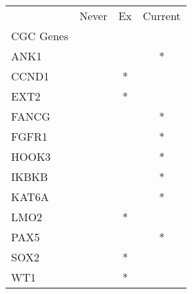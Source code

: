 \begin{tabular}{lccc}
\toprule
{} & Never & Ex & Current \\
CGC Genes &       &    &         \\
\midrule
ANK1      &       &    &       * \\
CCND1     &       &  * &         \\
EXT2      &       &  * &         \\
FANCG     &       &    &       * \\
FGFR1     &       &    &       * \\
HOOK3     &       &    &       * \\
IKBKB     &       &    &       * \\
KAT6A     &       &    &       * \\
LMO2      &       &  * &         \\
PAX5      &       &    &       * \\
SOX2      &       &  * &         \\
WT1       &       &  * &         \\
\bottomrule
\end{tabular}
